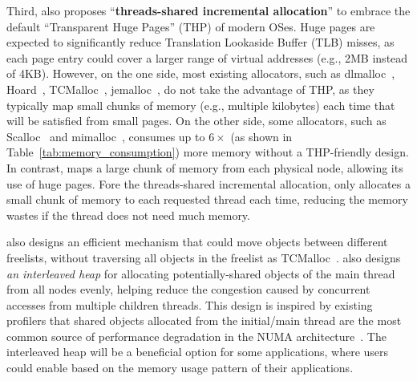 Third, \NM{} also proposes ``\textbf{threads-shared incremental allocation}'' to embrace the default ``Transparent Huge Pages'' (THP) of modern OSes. Huge pages are expected to significantly reduce Translation Lookaside Buffer (TLB) misses, as each page entry could cover a larger range of virtual addresses (e.g., 2MB instead of 4KB). However, on the one side, most existing allocators, such as dlmalloc~\cite{dlmalloc},  Hoard~\cite{Hoard}, TCMalloc~\cite{tcmalloc}, jemalloc~\cite{jemalloc}, do not take the advantage of THP, as they typically map small chunks of memory (e.g., multiple kilobytes) each time that will be satisfied from small pages. On the other side, some allocators, such as Scalloc~\cite{Scalloc} and mimalloc~\cite{mimalloc}, consumes up to $6\times$ (as shown in Table~\ref{tab:memory_consumption}) more memory without a THP-friendly design. In contrast, \NM{} maps a large chunk of memory from each physical node, allowing its use of huge pages. Fore the threads-shared incremental allocation, \NM{} only allocates a small chunk of memory to each requested thread each time,  reducing the memory wastes if the thread does not need  much memory. 

\NM{} also designs an efficient mechanism that could move objects between different freelists, without traversing all objects in the freelist as TCMalloc~\cite{tcmalloc}. \NM{} also designs \textit{an interleaved heap} for allocating potentially-shared objects of the main thread from all nodes evenly,  helping reduce the congestion caused by concurrent accesses from multiple children threads. This design is inspired by existing profilers that shared objects allocated from the initial/main thread are the most common source of performance degradation in the NUMA architecture~\cite{XuNuma, MemProf}. The interleaved heap will be a beneficial option for some applications, where users could enable based on the memory usage pattern of their applications. 


